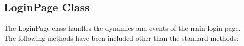 \documentclass{article}
\begin{document}
\subsection{LoginPage Class}
\par\noindent The LoginPage class handles the dynamics and events of the main login page. The following methods have been included other than the standard methods:

\end{document}
